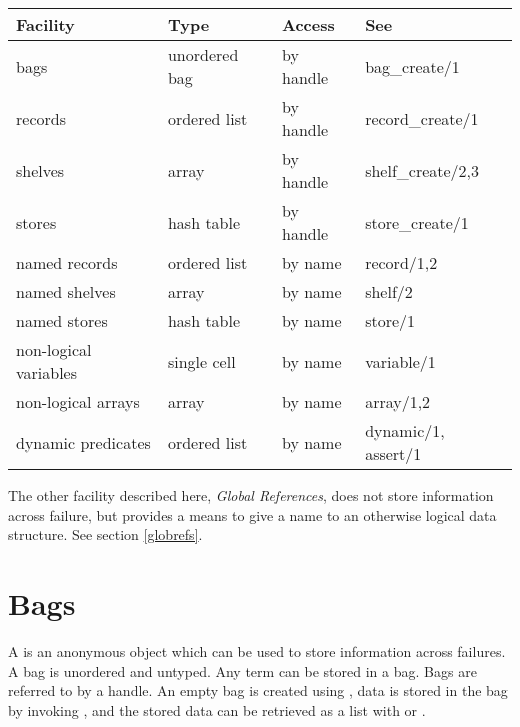\vspace{2mm}
\begin{center}
\begin{tabular}{l|l l l}
Facility & Type & Access & See \\
\hline
bags&                   unordered bag&  by handle&      bag_create/1 \\
records&                ordered list&   by handle&      record_create/1 \\
shelves&                array&          by handle&      shelf_create/2,3 \\
stores&                 hash table&     by handle&      store_create/1 \\
named records&          ordered list&   by name&        record/1,2 \\
named shelves&          array&          by name&        shelf/2 \\
named stores&           hash table&     by name&        store/1 \\
non-logical variables&  single cell&    by name&        variable/1 \\
non-logical arrays&     array&          by name&        array/1,2 \\
dynamic predicates&     ordered list&   by name&        dynamic/1, assert/1 \\
\end{tabular}
\end{center}
\vspace{2mm}

The other facility described here, \emph{Global References}, does not store
information across failure, but provides a means to give a name to
an otherwise logical data structure. See section \ref{globrefs}.


\section{Bags}

A  is an anonymous object which can be used to store
information across failures.
A bag is unordered and untyped. Any {\eclipse} term can be stored in a bag.
Bags are referred to by a handle.
An empty bag is created using
,
data is stored in the bag by invoking
,
and the stored data can be retrieved as a list with
 or
.

